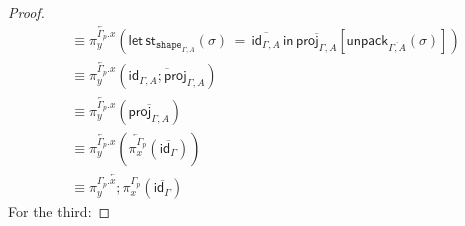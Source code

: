 \documentclass[10pt]{article}
\theoremstyle{definition}
\newcommand{\id}{\mathsf{id}}
\newcommand{\rewrite}[2]{\overleftarrow{#1}(#2)}
\newcommand\StI[2]{\ensuremath{\mathsf{st}_{#1}(#2)}}
\newcommand\StE[4]{\ensuremath{\mathsf{let} \, \StI{#1}{#3} \, = \, {#2} \, \mathsf{in} \, #4}}
\newcommand\unpack[2]{\ensuremath{\mathsf{unpack}_{#1}(#2)}}
\newcommand{\modeof}[1]{{#1}_p}
\newcommand{\tshape}[1]{\ensuremath{\mathtt{shape}_{#1}}}
\newcommand{\upstairs}[1]{\overline{#1}}
\newcommand\proj[1]{\ensuremath{\mathsf{proj}_{#1}}}
\begin{document}
\begin{proof}
\begin{align*}
&\equiv \rewrite{\pi^{\modeof{\Gamma}.x}_y}{\StE{\tshape{\Gamma, A}}{\upstairs{\id_{\Gamma, A}}}{\sigma}{\upstairs{\proj{\Gamma, A}}[\unpack{\upstairs{\Gamma, A}}{\sigma}]}} \\
&\equiv \rewrite{\pi^{\modeof{\Gamma}.x}_y}{\upstairs{\id_{\Gamma, A};\proj{\Gamma, A}}} \\
&\equiv \rewrite{\pi^{\modeof{\Gamma}.x}_y}{\upstairs{\proj{\Gamma, A}}} \\
&\equiv \rewrite{\pi^{\modeof{\Gamma}.x}_y}{\rewrite{\pi^{\modeof{\Gamma}}_x}{\upstairs{\id_\Gamma}}} \\
&\equiv \rewrite{\pi^{\modeof{\Gamma}.x}_y;\pi^{\modeof{\Gamma}}_x}{\upstairs{\id_\Gamma}}
\end{align*}
For the third:

\end{proof}
\end{document}
